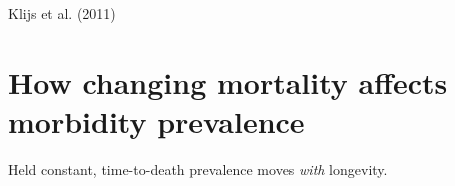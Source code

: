 \documentclass[20pt]{beamer}
\begin{document}
\begin{frame}[plain]
\begin{center}
\end{center}
Klijs et al. (2011)
\end{frame}

\section{How changing mortality affects morbidity prevalence}
\begin{frame}[plain]
\Large
\begin{center}
Held constant, time-to-death prevalence moves \emph{with} longevity.
\end{center}
\end{frame}
\end{document}
